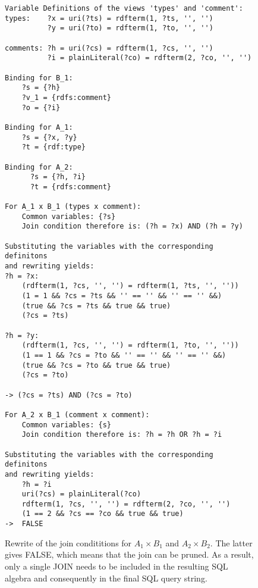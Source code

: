 \documentclass[a4paper,twoside,bibtotoc,abstracton,12pt,BCOR=15mm]{scrreprt}
\begin{document}
\begin{figure}[!h]
\begin{scriptsize}
\begin{lstlisting}
Variable Definitions of the views 'types' and 'comment':
types:    ?x = uri(?ts) = rdfterm(1, ?ts, '', '')
          ?y = uri(?to) = rdfterm(1, ?to, '', '')

comments: ?h = uri(?cs) = rdfterm(1, ?cs, '', '')
          ?i = plainLiteral(?co) = rdfterm(2, ?co, '', '')

Binding for B_1:
    ?s = {?h}
    ?v_1 = {rdfs:comment}
    ?o = {?i}

Binding for A_1:
    ?s = {?x, ?y}
    ?t = {rdf:type}

Binding for A_2:
      ?s = {?h, ?i}
      ?t = {rdfs:comment}

For A_1 x B_1 (types x comment):
    Common variables: {?s}
    Join condition therefore is: (?h = ?x) AND (?h = ?y)    

Substituting the variables with the corresponding definitons
and rewriting yields:
?h = ?x:
    (rdfterm(1, ?cs, '', '') = rdfterm(1, ?ts, '', '')) 
    (1 = 1 && ?cs = ?ts && '' == '' && '' == '' &&) 
    (true && ?cs = ?ts && true && true) 
    (?cs = ?ts)

?h = ?y:
    (rdfterm(1, ?cs, '', '') = rdfterm(1, ?to, '', ''))
    (1 == 1 && ?cs = ?to && '' == '' && '' == '' &&)
    (true && ?cs = ?to && true && true)
    (?cs = ?to)
    
-> (?cs = ?ts) AND (?cs = ?to)

For A_2 x B_1 (comment x comment):
    Common variables: {s}
    Join condition therefore is: ?h = ?h OR ?h = ?i  

Substituting the variables with the corresponding definitons
and rewriting yields:
    ?h = ?i
    uri(?cs) = plainLiteral(?co)
    rdfterm(1, ?cs, '', '') = rdfterm(2, ?co, '', '')
    (1 == 2 && ?cs == ?co && true && true) 
->  FALSE

\end{lstlisting}
\end{scriptsize}
\caption{Rewrite of the join condititions for $A_1 \times B_1$ and $A_2 \times B_2$. The latter gives FALSE, which means that the join can be
pruned. As a result, only a single JOIN needs to be included in the resulting SQL algebra and consequently in the final SQL query string. }
\label{fig:join-rewrite-expr}
\end{figure}

\end{document}
